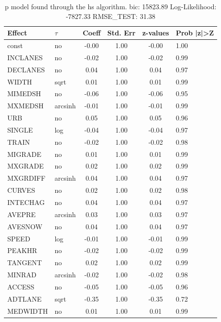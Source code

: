 \begin{table}
	\caption{p model found through the hs algorithm. bic: 15823.89 Log-Likelihood: -7827.33 RMSE_TEST: 31.38}
	\begin{center}
		\begin{tabular}{|l|l|c|c|c|l|}
			\hline
			Effect & $\tau$ & Coeff & Std. Err & z-values & Prob |z|>Z \\
			\hline
			const & no & -0.00 & 1.00 & -0.00 & 1.00 \\
			\hline
			INCLANES & no & -0.02 & 1.00 & -0.02 & 0.99 \\
			\hline
			DECLANES & no & 0.04 & 1.00 & 0.04 & 0.97 \\
			\hline
			WIDTH & sqrt & 0.01 & 1.00 & 0.01 & 0.99 \\
			\hline
			MIMEDSH & no & -0.06 & 1.00 & -0.06 & 0.95 \\
			\hline
			MXMEDSH & arcsinh & -0.01 & 1.00 & -0.01 & 0.99 \\
			\hline
			URB & no & 0.05 & 1.00 & 0.05 & 0.96 \\
			\hline
			SINGLE & log & -0.04 & 1.00 & -0.04 & 0.97 \\
			\hline
			TRAIN & no & -0.02 & 1.00 & -0.02 & 0.98 \\
			\hline
			MIGRADE & no & 0.01 & 1.00 & 0.01 & 0.99 \\
			\hline
			MXGRADE & no & 0.02 & 1.00 & 0.02 & 0.99 \\
			\hline
			MXGRDIFF & arcsinh & 0.04 & 1.00 & 0.04 & 0.97 \\
			\hline
			CURVES & no & 0.02 & 1.00 & 0.02 & 0.98 \\
			\hline
			INTECHAG & no & 0.04 & 1.00 & 0.04 & 0.97 \\
			\hline
			AVEPRE & arcsinh & 0.03 & 1.00 & 0.03 & 0.97 \\
			\hline
			AVESNOW & no & 0.04 & 1.00 & 0.04 & 0.97 \\
			\hline
			SPEED & log & -0.01 & 1.00 & -0.01 & 0.99 \\
			\hline
			PEAKHR & no & -0.02 & 1.00 & -0.02 & 0.99 \\
			\hline
			TANGENT & no & 0.02 & 1.00 & 0.02 & 0.99 \\
			\hline
			MINRAD & arcsinh & -0.02 & 1.00 & -0.02 & 0.98 \\
			\hline
			ACCESS & no & -0.05 & 1.00 & -0.05 & 0.96 \\
			\hline
			ADTLANE & sqrt & -0.35 & 1.00 & -0.35 & 0.72 \\
			\hline
			MEDWIDTH & no & 0.01 & 1.00 & 0.01 & 0.99 \\

\end{tabular}
\end{center}
\end{table}
